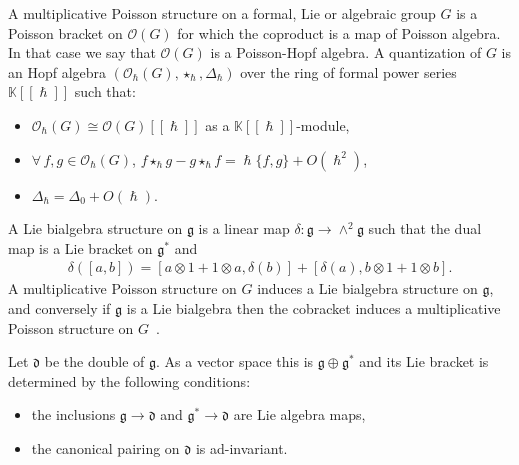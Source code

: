 \documentclass[10pt,a4paper]{amsart}
\numberwithin{equation}{section}
\newcommand{\mf}[1]{\mathfrak{#1}}
\newcommand{\h}{\hslash}
\newcommand{\ot}{\otimes}
\newcommand{\cO}{\mathcal O}
\newcommand{\kk}{\mathbb K}
\theoremstyle{definition}
\begin{document}
A multiplicative Poisson structure on a formal, Lie or algebraic group $G$ is a Poisson bracket on $\cO(G)$ for which the coproduct is a map of Poisson algebra. In that case we say that $\cO(G)$ is a Poisson-Hopf algebra.
A quantization of $G$ is an Hopf algebra $(\cO_\h(G),\star_\h,\Delta_\h)$ over the ring of formal power series $\kk[[\h]]$ such that:
\begin{itemize}\itemsep=0pt
	\item $\cO_\h(G)\cong \cO(G)[[\h]]$ as a $\kk[[\h]]$-module,
	\item $\forall\, f, g \in \cO_\h(G)$, $f\star_\h g - g\star_\h f=\h\{f,g\}+O(\h^2)$,
	\item $\Delta_\h=\Delta_0+O(\h)$.
\end{itemize}

A Lie bialgebra structure on $\mf g$ is a linear map $\delta\colon \mf g\rightarrow \wedge^2 \mf g$ such that the dual map is a Lie bracket on $\mf g^*$ and
\begin{gather*}
	\delta([a,b])=[a\ot 1+1\ot a,\delta(b)]+[\delta(a),b\ot 1+1\ot b].
\end{gather*}
A multiplicative Poisson structure on $G$ induces a Lie bialgebra structure on $\mf g$, and conversely if $\mf g$ is a Lie bialgebra then the cobracket induces a multiplicative Poisson structure on $G$~\cite{Drinfeld1987}.

Let $\mf d$ be the double of $\mf g$. As a vector space this is $\mf g \oplus \mf g^*$ and its Lie bracket is determined by the following conditions:
\begin{itemize}\itemsep=0pt
	\item the inclusions $\mf g\rightarrow \mf d$ and $\mf g^* \rightarrow \mf d$ are Lie algebra maps,
	\item the canonical pairing on $\mf d$ is ad-invariant.
\end{itemize}
\end{document}
